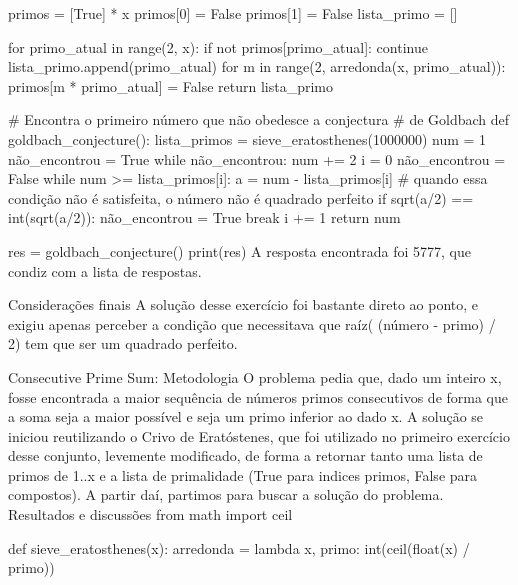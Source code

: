                 primos = [True] * x
                primos[0] = False
                primos[1] = False
                lista_primo = []

                for primo_atual in range(2, x):
                    if not primos[primo_atual]:
                        continue
                    lista_primo.append(primo_atual)
                    for m in range(2, arredonda(x, primo_atual)):
                        primos[m * primo_atual] = False
                return lista_primo

            # Encontra o primeiro número que não obedesce a conjectura
            # de Goldbach
            def goldbach_conjecture():
                lista_primos = sieve_eratosthenes(1000000)
                num = 1
                não_encontrou = True
                while não_encontrou:
                    num += 2
                    i = 0
                    não_encontrou = False
                    while num >= lista_primos[i]:
                        a = num - lista_primos[i]
                        # quando essa condição não é satisfeita, o número não é quadrado perfeito
                        if sqrt(a/2) == int(sqrt(a/2)):
                            não_encontrou = True
                            break
                        i += 1
                return num

            res = goldbach_conjecture()
            print(res)
            A resposta encontrada foi 5777, que condiz com a lista de respostas.

        Considerações finais
            A solução desse exercício foi bastante direto ao ponto, e exigiu apenas perceber a condição que necessitava que raíz( (número - primo) / 2) tem que ser um quadrado perfeito.
    
    Consecutive Prime Sum:
        Metodologia
            O problema pedia que, dado um inteiro x, fosse encontrada a maior sequência de números primos consecutivos de forma que a soma seja a maior possível e seja um primo inferior ao dado x.
            A solução se iniciou reutilizando o Crivo de Eratóstenes, que foi utilizado no primeiro exercício desse conjunto, levemente modificado, de forma a retornar tanto uma lista de primos de 1..x e a lista de primalidade (True para indices primos, False para compostos).
            A partir daí, partimos para buscar a solução do problema.
        Resultados e discussões
            from math import ceil

            def sieve_eratosthenes(x):
                arredonda = lambda x, primo: int(ceil(float(x) / primo))

